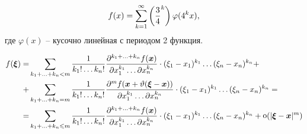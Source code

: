 $$
f(x) = \sum_{k=1}^{\infty} \left(\frac{3}{4}^k\right) \varphi (4^k x),
$$
где $\varphi(x)$ -- кусочно линейная с периодом 2 функция.


\begin{equation}
\begin{aligned}
    f(\mbox{\boldmath $\xi$}) = 
        & \sum_{k_1 + \ldots + k_n < m} 
            \frac{1}{k_1! \ldots k_n!}
            \frac{\partial^{k_1 + \ldots + k_n} f(\mbox{\boldmath $x$})}
            {\partial x_1^{k_1} \ldots \partial x_n^{k_n}} 
            \cdot
            (\xi_1 - x_1)^{k_1} \ldots (\xi_n - x_n)^{k_n} + \\
        + & \sum_{k_1 + \ldots + k_n = m} 
            \frac{1}{k_1! \ldots k_n!}
            \frac{\partial^{m} f(\mbox{\boldmath $x$} + \vartheta(\mbox{\boldmath $\xi$} - \mbox{\boldmath $x$}))}
            {\partial x_1^{k_1} \ldots \partial x_n^{k_n}} 
            \cdot
            (\xi_1 - x_1)^{k_1} \ldots (\xi_n - x_n)^{k_n} = \\
        = & \sum_{k_1 + \ldots + k_n \leqslant m} 
            \frac{1}{k_1! \ldots k_n!}
            \frac{\partial^{k_1 + \ldots + k_n} f(\mbox{\boldmath $x$})}
            {\partial x_1^{k_1} \ldots \partial x_n^{k_n}} 
            \cdot
            (\xi_1 - x_1)^{k_1} \ldots (\xi_n - x_n)^{k_n} + \mathop{\mathrm{o}}\nolimits(|\mbox{\boldmath $\xi$} - \mbox{\boldmath $x$}|^m)
\end{aligned}
\end{equation}





